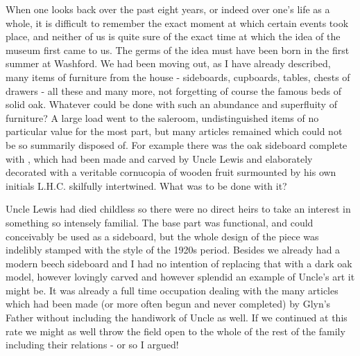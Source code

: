 
When one looks back over the past eight years, or indeed over one's life as a whole, it is difficult to remember the exact moment at which certain events took place, and neither of us is quite sure of the exact time at which the idea of the museum first came to us. The germs of the idea must have been born in the first summer at Washford. We had been moving out, as I have already described, many items of furniture from the house - sideboards, cupboards, tables, chests of drawers - all these and many more, not forgetting of course the famous beds of solid oak. Whatever could be done with such an abundance and superfluity of furniture? A large load went to the saleroom, undistinguished items of no particular value for the most part, but many articles remained which could not be so summarily disposed of. For example there was the oak sideboard complete with , which had been made and carved by Uncle Lewis and elaborately decorated with a veritable cornucopia of wooden fruit surmounted by his own initials L.H.C. skilfully intertwined. What was to be done with it?

Uncle Lewis had died childless so there were no direct heirs to take an interest in something so intensely familial. The base part was functional, and could conceivably be used as a sideboard, but the whole design of the piece was indelibly stamped with the style of the 1920s period. Besides we already had a modern beech sideboard and I had no intention of replacing that with a dark oak model, however lovingly carved and however splendid an example of Uncle's art it might be. It was already a full time occupation dealing with the many articles which had been made (or more often begun and never completed) by Glyn's Father without including the handiwork of Uncle as well. If we continued at this rate we might as well throw the field open to the whole of the rest of the family including their relations - or so I argued! 

 \\
 \\
 \\
 \\
 \\
 \\
 \\
 \\

